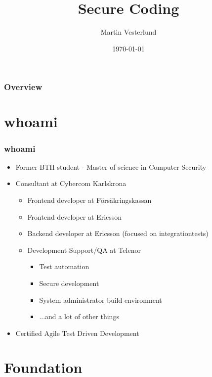 \documentclass{beamer}
\title[Secure Coding]{Secure Coding }
\author{Martin Vesterlund}
\institute[Cybercom]
{
Cybercom Group AB \\
\medskip
\textit{martin.vesterlund@cybercom.com}
}
\date{\today}
\begin{document}
\begin{frame}
\titlepage %
\end{frame}

\begin{frame}
\frametitle{Overview}
\tableofcontents
\end{frame}

\section{whoami}
\begin{frame}
\frametitle{whoami}
\begin{itemize}
  \item Former BTH student - Master of science in Computer Security
  \item Consultant at Cybercom Karlskrona
  \begin{itemize}
    \item Frontend developer at Försäkringskassan
    \item Frontend developer at Ericsson
    \item Backend developer at Ericsson (focused on integrationtests)
    \item Development Support/QA at Telenor
    \begin{itemize}
      \item Test automation
      \item Secure development
      \item System administrator build environment
      \item ...and a lot of other things
    \end{itemize}
  \end{itemize}
  \item Certified Agile Test Driven Development
\end{itemize}
\end{frame}
\section{Foundation}
\end{document}
